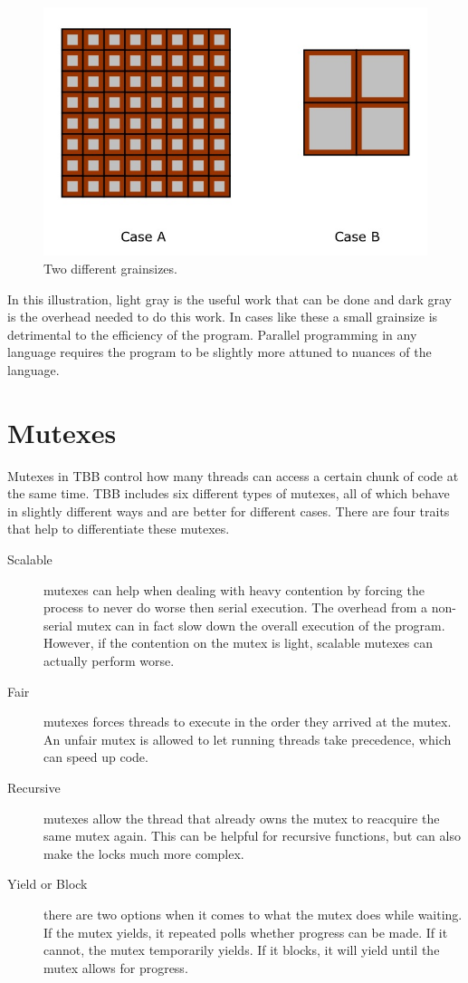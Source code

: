 \documentclass{article}
\begin{document}
  \begin{figure}[h]
  \centering
  \includegraphics[scale=.65]{pic/Grainsize.jpg}
  \caption{Two different grainsizes.}
  \end{figure}

  In this illustration, light gray is the useful work that can be done and dark gray is the overhead needed to do this work. In cases like these a small grainsize is detrimental to the efficiency of the program. Parallel programming in any language requires the program to be slightly more attuned to nuances of the language.


  \section{Mutexes}
  Mutexes in TBB control how many threads can access a certain chunk of code at the same time. TBB includes six different types of mutexes, all of which behave in slightly different ways and are better for different cases. There are four traits that help to differentiate these mutexes. 

  \begin{description}
  \item[Scalable] mutexes can help when dealing with heavy contention by forcing the process to never do worse then serial execution. The overhead from a non-serial mutex can in fact slow down the overall execution of the program. However, if the contention on the mutex is light, scalable mutexes can actually perform worse.
  \item[Fair] mutexes forces threads to execute in the order they arrived at the mutex. An unfair mutex is allowed to let running threads take precedence, which can speed up code.
  \item[Recursive] mutexes allow the thread that already owns the mutex to reacquire the same mutex again. This can be helpful for recursive functions, but can also make the locks much more complex.
  \item[Yield or Block] there are two options when it comes to what the mutex does while waiting. If the mutex yields, it repeated polls whether progress can be made. If it cannot, the mutex temporarily yields. If it blocks, it will yield until the mutex allows for progress.
  \end{description}
\end{document}
